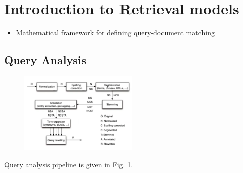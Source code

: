 \section{Introduction to Retrieval models}
\begin{itemize}
	\item Mathematical framework for defining query-document matching
\end{itemize}
\subsection{Query Analysis}
\begin{figure}[h!]
	\centering
	\includegraphics[width=0.5\textwidth]{figures/query_analysis_pipeline.png}
	\label{img:query_analysis_pipeline}
\end{figure}
Query analysis pipeline is given in Fig. \ref{img:query_analysis_pipeline}.
